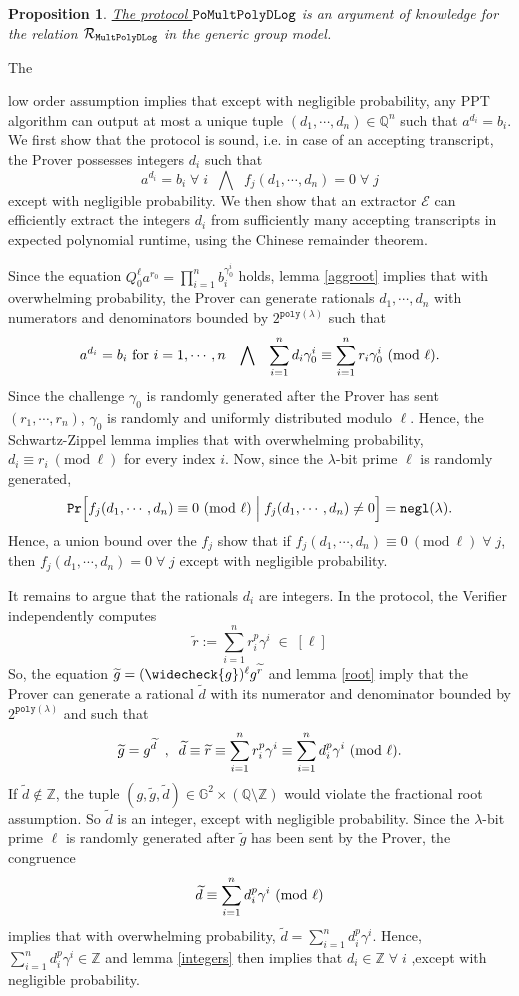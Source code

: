\documentclass[11pt, lettersize, notitlepage, leqno, footskip=0.6cm]{article}
\newcommand{\bz}{\mathbb Z}
\newcommand{\bq}{\mathbb Q}
\newcommand{\slim}{\sum\limits}
\newcommand{\ttt}{\texttt}
\newcommand{\bG}{\mathbb{G}}
\newcommand{\negl}{\ttt{{negl}}}
\newcommand{\wti}{\widetilde}
\newcommand{\mc}{\mathcal}
\newcommand{\sm}{\setminus}
\newcommand{\lam}{\lambda}
\newcommand{\weck}{\widecheck}
\newcommand{\vs}{\vspace{-0.15cm}}
\newcommand{\op}{overwhelming probability}
\newcommand{\np}{negligible probability}
\newcommand{\Mod}[1]{\ (\mathrm{mod}\ #1)}
\newcommand{\E}{\mc{E}}
\newtheorem{Prop}[Thm]{Proposition}
\numberwithin{equation}{section}
\begin{document}
\vspace{0.2cm}


\begin{Prop}\hyperlink{Mult} {The protocol $\tt{PoMultPolyDLog}$} is an argument of knowledge for the relation $\mc{R}_{{\tt{MultPolyDLog}}}$ in the generic group model.\end{Prop}

\begin{prf} \hypertarget{Generalized}{The} low order assumption implies that except with \np, any PPT algorithm can output at most a unique tuple $(d_1,\cdots,d_n)\in\bq^n$ such that $a^{d_i} = b_i$. We first show that the protocol is sound, i.e. in case of an accepting transcript, the Prover possesses integers $d_i$ such that $$a^{d_i} = b_i\;\forall\; i\;\;\bigwedge\;\;f_j(d_1,\cdots,d_n) = 0\;\forall\; j $$ except with \np.  We then show that an extractor $\E$ can efficiently extract the integers $d_i$ from sufficiently many accepting transcripts in expected polynomial runtime, using the Chinese remainder theorem.

Since the equation $Q_0^{\ell} a^{r_0} = \prod_{i=1}^n b_i^{\gamma_{0}^i}$ holds, lemma \ref{aggroot} implies that with \op, the Prover can generate rationals $d_1,\cdots,d_n$ with numerators and denominators bounded by $2^{\ttt{poly}(\lam)}$ such that \vs $$a^{d_i} = b_i \text{ for } i=1,\cdots,n \;\;\;\bigwedge\;\;\; \sum\limits_{i=1}^n d_i\gamma_{0}^i\equiv \sum\limits_{i=1}^n r_i\gamma_{0}^i\Mod{\ell}. \vs $$ Since the challenge $\gamma_{0}$ is randomly generated after the Prover has sent $(r_1,\cdots,r_n)$, $\gamma_{0}$ is randomly and uniformly distributed modulo $\ell$. Hence, the Schwartz-Zippel lemma implies that with \op, $d_i\equiv r_i\Mod{\ell}$ for every index $i$. Now, since the $\lam$-bit prime $\ell$ is randomly generated, \vs $$\ttt{Pr}\Big[f_j(d_1,\cdots,d_n)\equiv 0\Mod{\ell} \;\Big|\; f_j(d_1,\cdots,d_n)\neq 0 \Big] = \negl(\lam) . \vs $$ Hence, a union bound over the $f_j$ show that if $f_j(d_1,\cdots,d_n)\equiv 0\Mod{\ell}\;\forall\;j$, then $f_j(d_1,\cdots,d_n) = 0 \;\forall\;j$ except with \np.

It remains to argue that the rationals $d_i$ are integers. In the protocol, the Verifier independently computes \vs $$\wti{r}:= \slim_{i=1}^n r_i^{p}\gamma^i\;\in\; [\ell]$$ So, the equation $\wti{g} = (\weck{g})^{\ell}g^{\wti{r}} $ and lemma \ref{root} imply that the Prover can generate a rational $\wti{d}$ with its numerator and denominator bounded by $2^{\ttt{poly}(\lam)}$ and such that \vs $$\wti{g} = g^{\wti{d}}\;\;,\;\;\wti{d}\equiv \wti{r}\equiv \slim_{i=1}^n r_i^p\gamma^i\equiv \slim_{i=1}^n d_i^p\gamma^i\Mod{\ell}. \vs $$ If $\wti{d}\notin\bz$, the tuple $(g, \wti{g}, \wti{d})\in \bG^2\times (\bq\sm \bz)$ would violate the fractional root assumption. So $\wti{d}$ is an integer, except with negligible probability. Since the $\lam$-bit prime $\ell$ is randomly generated after $\wti{g}$ has been sent by the Prover, the congruence \vs $$\wti{d}\equiv \slim_{i=1}^n d_i^p\gamma^i\Mod{\ell} \vs $$ implies that with \op, $\wti{d} = \slim_{i=1}^n d_i^p\gamma^i.$ Hence, $\slim_{i=1}^n d_i^p\gamma^i\in \bz$ and lemma \ref{integers} then implies that $ d_i\in \bz\;\forall\;i$ ,except with negligible probability. 


\end{prf}
\end{document}
